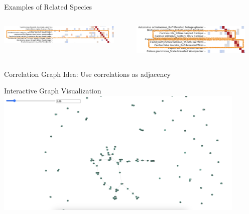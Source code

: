\begin{frame}{Examples of Related Species}
    \begin{columns}
        \begin{column}{0.5\textwidth}
            \centering
            \includegraphics[height=0.9\textheight,width=0.9\textwidth,keepaspectratio]{images/sim1.png}
        \end{column}
        \begin{column}{0.5\textwidth}
            \centering
            \includegraphics[height=0.9\textheight,width=0.9\textwidth,keepaspectratio]{images/sim2.png}
        \end{column}
    \end{columns}
\end{frame}

\begin{frame}{Correlation Graph}
    \centering Idea: Use correlations as adjacency
\end{frame}

\begin{frame}{Interactive Graph Visualization}
    \includegraphics[height=0.9\textheight, width=0.9\textwidth]{images/asid_corr_graphvis.png}
\end{frame}

